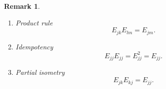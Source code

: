 \documentclass[aps,preprint]{revtex4}%
\newtheorem{remark}[theorem]{Remark}
\begin{document}
\begin{remark}
\begin{enumerate}
\item Product rule
\begin{equation}
E_{jk}E_{lm}=E_{jm}.
\end{equation}


\item Idempotency
\begin{equation}
E_{jj}E_{jj}=E_{jj}^{2}=E_{jj}.
\end{equation}


\item Partial isometry
\begin{equation}
E_{jk}E_{kj}=E_{jj}.
\end{equation}

\end{enumerate}
\end{remark}
\end{document}
